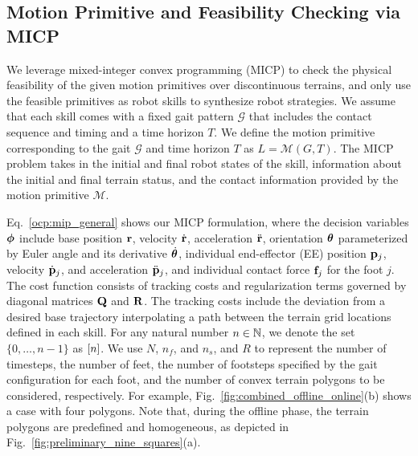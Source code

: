 \documentclass[letterpaper, 10 pt, conference]{ieeeconf}
\begin{document}
\subsection{Motion Primitive and Feasibility Checking via MICP}\label{sec:motion_primitive}

We leverage
mixed-integer convex programming (MICP) 
to check the physical feasibility of the given motion primitives 
over discontinuous terrains,
and only use the feasible primitives as robot skills to synthesize robot strategies.
We assume that each skill
comes with a fixed gait pattern $\mathcal{G}$ that includes the contact sequence and timing and a time horizon $T$.
We define the motion primitive corresponding to the gait $\mathcal{G}$ and time horizon $T$ as $L = \mathcal{M}(G, T)$. 
The MICP problem takes in
the initial and final robot states of the skill, 
information about the initial and final terrain status,
and the contact information provided by the motion primitive $\mathcal{M}$.

Eq.~\ref{ocp:mip_general} shows our MICP formulation, where the decision variables $\bm{\phi}$ include base position $\mathbf{r}$, velocity $\dot{\mathbf{r}}$, acceleration $\ddot{\mathbf{r}}$, orientation $\bm{\theta}$ parameterized by Euler angle and its derivative $\dot{\bm{\theta}}$, individual 
end-effector
(EE)
position $\mathbf{p}_j$, velocity $\dot{\mathbf{p}}_j$, and acceleration $\ddot{\mathbf{p}}_j$, and individual contact force $\mathbf{f}_j$ for the foot $j$. The cost function consists of tracking costs and regularization terms governed by diagonal matrices $\mathbf{Q}$ and $\mathbf{R}$. 
The tracking costs include the deviation from a desired base trajectory interpolating a path between the terrain grid locations defined in each skill.
For any natural number $n \in \mathbb{N}$,
we denote the set $\{0, \dots, n-1\}$ as $[n]$.
We use $N$, $n_f$, and $n_s$, and $R$ to represent the number of timesteps, the number of feet, the number of footsteps specified by the gait configuration for each foot, and the number of convex terrain polygons to be considered, respectively. For example,  Fig.~\ref{fig:combined_offline_online}(b) shows a case with four polygons. Note that, during the offline phase, the terrain polygons are predefined and homogeneous, as depicted in Fig.~\ref{fig:preliminary_nine_squares}(a).
\end{document}
